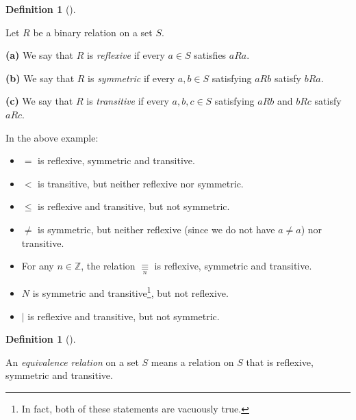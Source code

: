 \documentclass[numbers=enddot,12pt,final,onecolumn,notitlepage]{scrartcl}%
\numberwithin{exer}{subsection}
\theoremstyle{definition}
\newtheorem{defi}[theo]{Definition}
\newenvironment{definition}[1][]
{\begin{defi}[#1]\begin{leftbar}}
{\end{leftbar}\end{defi}}
\begin{document}
\begin{definition}
Let $R$ be a binary relation on a set $S$.

\textbf{(a)} We say that $R$ is \textit{reflexive} if every $a\in S$ satisfies
$aRa$.

\textbf{(b)} We say that $R$ is \textit{symmetric} if every $a,b\in S$
satisfying $aRb$ satisfy $bRa$.

\textbf{(c)} We say that $R$ is \textit{transitive} if every $a,b,c\in S$
satisfying $aRb$ and $bRc$ satisfy $aRc$.
\end{definition}

In the above example:

\begin{itemize}
\item $=$ is reflexive, symmetric and transitive.

\item $<$ is transitive, but neither reflexive nor symmetric.

\item $\leq$ is reflexive and transitive, but not symmetric.

\item $\neq$ is symmetric, but neither reflexive (since we do not have $a\neq
a$) nor transitive.

\item For any $n\in\mathbb{Z}$, the relation $\underset{n}{\equiv}$ is
reflexive, symmetric and transitive.

\item $N$ is symmetric and transitive\footnote{In fact, both of these
statements are vacuously true.}, but not reflexive.

\item $\mid$ is reflexive and transitive, but not symmetric.
\end{itemize}

\begin{definition}
An \textit{equivalence relation} on a set $S$ means a relation on $S$ that is
reflexive, symmetric and transitive.
\end{definition}
\end{document}
